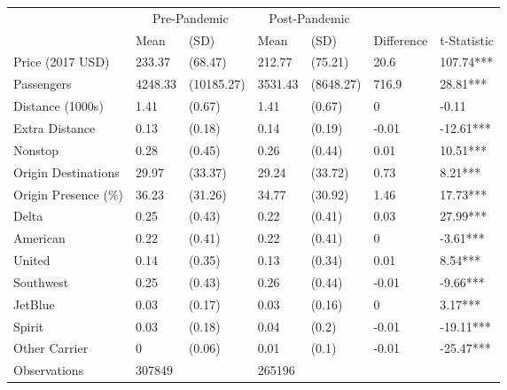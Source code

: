 
\begin{tabular}[t]{lllllll}
\toprule
\multicolumn{1}{c}{ } & \multicolumn{2}{c}{Pre-Pandemic} & \multicolumn{2}{c}{Post-Pandemic} & \multicolumn{2}{c}{ } \\
\cmidrule(l{3pt}r{3pt}){2-3} \cmidrule(l{3pt}r{3pt}){4-5}
 & Mean & (SD) & Mean & (SD) & Difference & t-Statistic\\
\midrule
Price (2017 USD) & 233.37 & (68.47) & 212.77 & (75.21) & 20.6 & 107.74***\\
Passengers & 4248.33 & (10185.27) & 3531.43 & (8648.27) & 716.9 & 28.81***\\
Distance (1000s) & 1.41 & (0.67) & 1.41 & (0.67) & 0 & -0.11\\
Extra Distance & 0.13 & (0.18) & 0.14 & (0.19) & -0.01 & -12.61***\\
Nonstop & 0.28 & (0.45) & 0.26 & (0.44) & 0.01 & 10.51***\\
Origin Destinations & 29.97 & (33.37) & 29.24 & (33.72) & 0.73 & 8.21***\\
Origin Presence (\%) & 36.23 & (31.26) & 34.77 & (30.92) & 1.46 & 17.73***\\
Delta & 0.25 & (0.43) & 0.22 & (0.41) & 0.03 & 27.99***\\
American & 0.22 & (0.41) & 0.22 & (0.41) & 0 & -3.61***\\
United & 0.14 & (0.35) & 0.13 & (0.34) & 0.01 & 8.54***\\
Southwest & 0.25 & (0.43) & 0.26 & (0.44) & -0.01 & -9.66***\\
JetBlue & 0.03 & (0.17) & 0.03 & (0.16) & 0 & 3.17***\\
Spirit & 0.03 & (0.18) & 0.04 & (0.2) & -0.01 & -19.11***\\
Other Carrier & 0 & (0.06) & 0.01 & (0.1) & -0.01 & -25.47***\\
Observations & 307849 &  & 265196 &  &  & \\
\bottomrule
\end{tabular}
